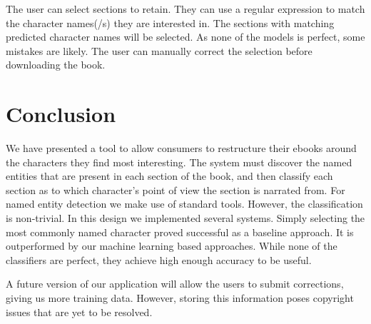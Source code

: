 \documentclass[11pt,a4paper]{article}
\begin{document}
The user can select sections to retain.
They can use a regular expression to match the character names(/s) they are interested in.
The sections with matching predicted character names will be selected.
As none of the models is perfect, some mistakes are likely.
The user can manually correct the selection before downloading the book.



\section{Conclusion}\label{sec:conclusion}
We have presented a tool to allow consumers to restructure their ebooks around the characters they find most interesting.
The system must discover the named entities that are present in each section of the book,
and then classify each section as to which character's point of view the section is narrated from.
For named entity detection we make use of standard tools.
However, the classification is non-trivial.
In this design we implemented several systems.
Simply selecting the most commonly named character proved successful as a baseline approach.
It is outperformed by our machine learning based  approaches.
While none of the classifiers are perfect,
they achieve high enough accuracy to be useful.


A future version of our application will allow the users to submit corrections, giving us more training data.
However, storing this information poses copyright issues that are yet to be resolved.



\end{document}
